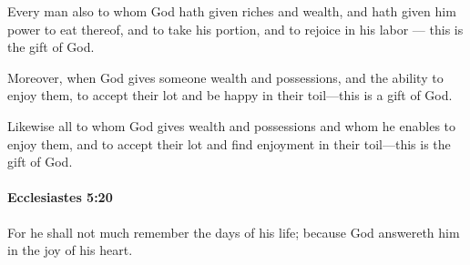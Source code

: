 			\begin{versebox}
					\item[BHS] 
					\item[LXX] 
					\item[ASV] Every man also to whom God hath given riches and wealth, and hath given him power to eat thereof, and to take his portion, and to rejoice in his labor — this is the gift of God.
					\item[NIV] Moreover, when God gives someone wealth and possessions, and the ability to enjoy them, to accept their lot and be happy in their toil—this is a gift of God.
					\item[NRSV] Likewise all to whom God gives wealth and possessions and whom he enables to enjoy them, and to accept their lot and find enjoyment in their toil—this is the gift of God.
			\end{versebox}

		\paragraph{Ecclesiastes 5:20} %
			\label{ECCLESIASTES-5-20}

			For he shall not much remember the days of his life; because God answereth him in the joy of his heart.

